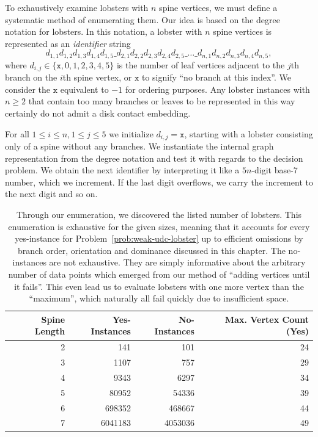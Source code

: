 To exhaustively examine lobsters with $n$ spine vertices, we must define a systematic method of enumerating them. Our idea is based on the degree notation for lobsters. In this notation, a lobster with $n$ spine vertices is represented as an \emph{identifier} string $$d_{1,1}d_{1,2}d_{1,3}d_{1,4}d_{1,5}\_d_{2,1}d_{2,2}d_{2,3}d_{2,4}d_{2,5}\_\ldots\_d_{n,1}d_{n,2}d_{n,3}d_{n,4}d_{n,5},$$ where $d_{i,j} \in \{ \texttt x, 0, 1, 2, 3, 4, 5 \}$ is the number of leaf vertices adjacent to the $j$th branch on the $i$th spine vertex, or $\texttt x$ to signify ``no branch at this index''. We consider the $\texttt x$ equivalent to $-1$ for ordering purposes.
Any lobster instances with $n \geq 2$ that contain too many branches or leaves to be represented in this way certainly do not admit a disk contact embedding.

For all $1 \leq i \leq n, 1 \leq j \leq 5$ we initialize $d_{i,j} = \texttt x$, starting with a lobster consisting only of a spine without any branches. We instantiate the internal graph representation from the degree notation and test it with regards to the decision problem.
We obtain the next identifier by interpreting it like a $5n$-digit base-7 number, which we increment. If the last digit overflows, we carry the increment to the next digit and so on.

\begin{table}
\centering
\begin{tabular}{ r|r|r|r }
\toprule
Spine Length & Yes-Instances & No-Instances & Max. Vertex Count (Yes) \\
 \hline
2	 & 141	 	& 101 	& 24 \\
3	 & 1107	 	& 757 	& 29 \\
4	 & 9343	 	& 6297 	& 34 \\
5	 & 80952	& 54336 	& 39 \\
6	 & 698352	& 468667 	& 44 \\
7	 & 6041183	& 4053036 	& 49 \\
\bottomrule
\end{tabular}
 \caption{Through our enumeration, we discovered the listed number of lobsters. This enumeration is exhaustive for the given sizes, meaning that it accounts for every yes-instance for Problem~\ref{prob:weak-udc-lobster} up to efficient omissions by branch order, orientation and dominance discussed in this chapter. The no-instances are not exhaustive. They are simply informative about the arbitrary number of data points which emerged from our method of ``adding vertices until it fails''. This even lead us to evaluate lobsters with one more vertex than the ``maximum'', which naturally all fail quickly due to insufficient space. }
\label{tbl:instance-count}
\end{table}

